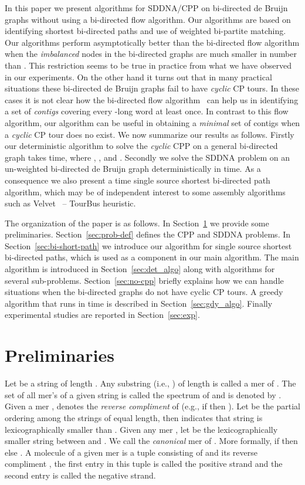 \documentclass[runningheads]{llncs}
\begin{document}
In this paper we present algorithms for SDDNA/CPP  on bi-directed de Bruijn graphs without
using a bi-directed flow algorithm. Our algorithms are based on identifying shortest bi-directed
paths and use of weighted bi-partite matching. Our algorithms perform asymptotically better than the bi-directed flow algorithm when the {\em imbalanced} nodes in the bi-directed graphs are much smaller in number than . This restriction seems to be true in practice from what we have observed in our experiments. On 
the other hand it turns out that in many practical situations these bi-directed de Bruijn graphs 
fail to have {\em cyclic} CP tours. In these cases it is not clear how the bi-directed flow 
algorithm~\cite{bidirected_graph} can help us in identifying a set of {\em contigs} covering every 
-long word at least once. In contrast to this flow algorithm, our algorithm can be useful
in obtaining a {\em minimal} set of contigs when a {\em cyclic} CP tour does no exist. We now
summarize our results as follows. Firstly our deterministic algorithm to solve the {\em cyclic}
CPP on a general bi-directed graph takes  time, 
where , , 
 and .
Secondly we solve the SDDNA problem on an un-weighted bi-directed de Bruijn graph deterministically 
in  time. As a consequence we also present a  
time single source shortest bi-directed path algorithm, which may be of independent interest to 
some assembly algorithms such as Velvet~\cite{velvet08} -- TourBus heuristic.


The organization of the paper is as follows. In Section~\ref{sec:prelim} we provide some preliminaries. 
Section~\ref{sec:prob-def} defines the CPP and SDDNA problems. In Section~\ref{sec:bi-short-path} we
introduce our algorithm for single source shortest bi-directed paths, which is used as a component
in our main algorithm. The main algorithm is introduced in Section~\ref{sec:det_algo} along with
algorithms for several sub-problems. Section~\ref{sec:no-cpp} briefly explains how we can handle situations when
the bi-directed graphs do not have cyclic CP tours. A greedy algorithm that runs in  time
is described in Section~\ref{sec:gdy_algo}. Finally experimental studies are reported in 
Section~\ref{sec:exp}.


\section{Preliminaries}
\label{sec:prelim}
Let  be a string of length . Any substring  (i.e., ) of 
length  is called a mer of . The set of all mer's of a given string  is called the spectrum of 
 and is denoted by . Given a mer ,  denotes the {\em reverse compliment} of  (e.g., if  then ). Let  be the partial ordering among the strings of equal length, 
then  indicates that string  is lexicographically smaller than . Given any mer , 
let  be the lexicographically smaller string between  and . 
We call  the {\em canonical} mer of . More formally, if  then  
else . A molecule of a given mer  is a tuple  
consisting of  and its reverse compliment , the first entry in this tuple is called the 
positive strand and the second entry is called the negative strand.
\end{document}
